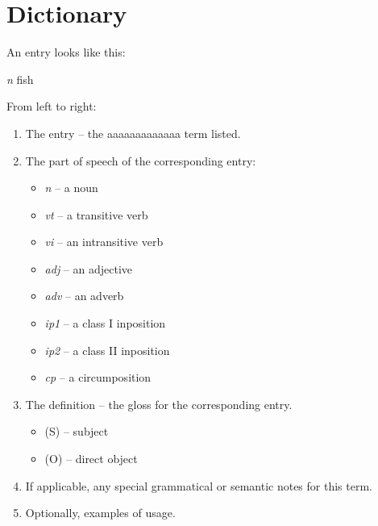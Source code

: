 \documentclass{book}
\newcommand{\lname}{aaaaaaaaaaaaa}
\begin{document}
\appendix

\chapter{Dictionary}

An entry looks like this:

 \textit{n}
\quad fish

From left to right:

\begin{enumerate}
    \item The entry -- the \lname{} term listed.
    \item The part of speech of the corresponding entry:
    \begin{itemize}
        \item \textit{n} -- a noun
        \item \textit{vt} -- a transitive verb
        \item \textit{vi} -- an intransitive verb
        \item \textit{adj} -- an adjective
        \item \textit{adv} -- an adverb
        \item \textit{ip1} -- a class I inposition
        \item \textit{ip2} -- a class II inposition
        \item \textit{cp} -- a circumposition
    \end{itemize}
    \item The definition -- the gloss for the corresponding entry.
    \begin{itemize}
        \item (S) -- subject
        \item (O) -- direct object
    \end{itemize}
    \item If applicable, any special grammatical or semantic notes for this term.
    \item Optionally, examples of usage.
\end{enumerate}

\begin{multicols}{2}
    
\end{multicols}
\end{document}
